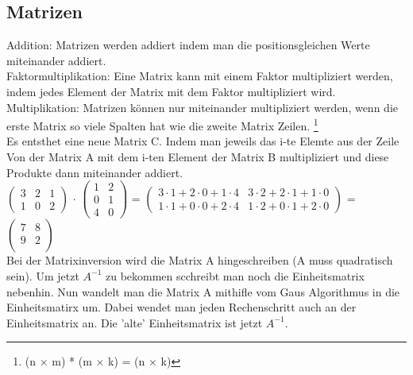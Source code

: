 \documentclass[a4paper,10pt]{scrartcl}
\begin{document}
        \subsection{Matrizen}
            Addition: Matrizen werden addiert indem man die positionsgleichen Werte miteinander addiert. \\
            Faktormultiplikation: Eine Matrix kann mit einem Faktor multipliziert werden, indem jedes Element der Matrix mit dem Faktor multipliziert wird. \\
            Multiplikation: Matrizen können nur miteinander multipliziert werden, wenn die erste Matrix so viele Spalten hat wie die zweite Matrix Zeilen. \footnote{(n $\times$ m) * (m $\times$ k) = (n $\times$ k)} \\
            Es entsthet eine neue Matrix C. Indem man jeweils das i-te Elemte aus der Zeile Von der Matrix A mit dem i-ten Element der Matrix B multipliziert und diese Produkte dann miteinander addiert. \\
            $\begin{pmatrix}
                3 & 2 & 1 \\
                1 & 0 & 2
            \end{pmatrix}$
            $\cdot$
            $\begin{pmatrix}
                1 & 2 \\
                0 & 1 \\
                4 & 0
            \end{pmatrix}$
            = 
            $\begin{pmatrix}
                3 \cdot 1 + 2 \cdot 0 + 1 \cdot 4 & 3 \cdot 2 + 2 \cdot 1 + 1 \cdot 0  \\
                1 \cdot 1 + 0 \cdot 0 + 2 \cdot 4 & 1 \cdot 2 + 0 \cdot 1 + 2 \cdot 0 
            \end{pmatrix}$
            = $\begin{pmatrix}
                7 & 8 \\
                9 & 2 \\
            \end{pmatrix}$ \\
            Bei der Matrixinversion wird die Matrix A hingeschreiben (A muss quadratisch sein). Um jetzt $A^{-1}$ zu bekommen scchreibt man noch die Einheitsmatrix nebenhin.
            Nun wandelt man die Matrix A mithifle vom Gaus Algorithmus in die Einheitsmatirx um. Dabei wendet man jeden Rechenschritt auch an der Einheitsmatrix an. 
            Die 'alte' Einheitsmatrix ist jetzt $A^{-1}$.
\end{document}
